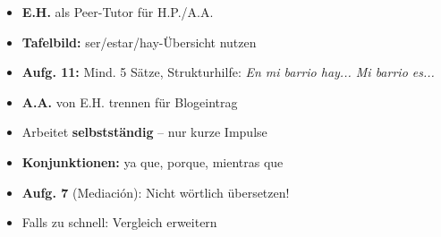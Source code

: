 \documentclass[11pt, a4paper]{article}
\begin{document}
\normalsize
\vspace{0.3cm}


\begin{minipage}[t]{0.48\textwidth}
\begin{tcolorbox}[
    colback=gruppeA!10,
    colframe=gruppeA,
    title={\footnotesize\bfseries Tipps Gruppe A},
    fonttitle=\bfseries,
    boxrule=0.5pt,
    top=2pt, bottom=2pt, left=4pt, right=4pt
]
\footnotesize
\begin{itemize}
\item \textbf{E.H.} als Peer-Tutor für H.P./A.A.
\item \textbf{Tafelbild:} ser/estar/hay-Übersicht nutzen
\item \textbf{Aufg. 11:} Mind. 5 Sätze, Strukturhilfe: \textit{En mi barrio hay... Mi barrio es...}
\item \textbf{A.A.} von E.H. trennen für Blogeintrag
\end{itemize}
\end{tcolorbox}
\end{minipage}
\hfill
\begin{minipage}[t]{0.48\textwidth}
\begin{tcolorbox}[
    colback=gruppeB!10,
    colframe=gruppeB,
    title={\footnotesize\bfseries Tipps Gruppe B},
    fonttitle=\bfseries,
    boxrule=0.5pt,
    top=2pt, bottom=2pt, left=4pt, right=4pt
]
\footnotesize
\begin{itemize}
\item Arbeitet \textbf{selbstständig} -- nur kurze Impulse
\item \textbf{Konjunktionen:} ya que, porque, mientras que
\item \textbf{Aufg. 7} (Mediación): Nicht wörtlich übersetzen!
\item Falls zu schnell: Vergleich erweitern
\end{itemize}
\end{tcolorbox}
\end{minipage}

\vspace{0.3cm}

\end{document}
